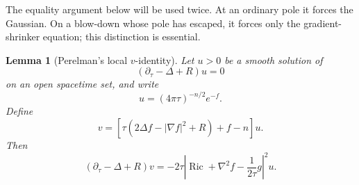 \documentclass[10pt]{coll-l}
\newtheorem{lemma}[theorem]{Lemma}
\theoremstyle{definition}
\theoremstyle{remark}
\numberwithin{section}{chapter}
\numberwithin{equation}{chapter}
\newcommand{\Ric}{\operatorname{Ric}}
\begin{document}
The equality argument below will be used twice.  At an ordinary pole it
forces the Gaussian.  On a blow-down whose pole has escaped, it forces only
the gradient-shrinker equation; this distinction is essential.

\begin{lemma}[Perelman's local $v$-identity]
\label{lem:red-v-identity}
Let $u>0$ be a smooth solution of
\begin{equation}
                    (\partial_\tau-\Delta+R)u=0         \label{eq:red-conjugate-heat-equality}
\end{equation}
on an open spacetime set, and write
\begin{equation}
                    u=(4\pi\tau)^{-n/2}e^{-f}.           \label{eq:red-density-potential}
\end{equation}
Define
\begin{equation}
 v=\left[\tau(2\Delta f-|\nabla f|^2+R)+f-n\right]u.    \label{eq:red-v-definition}
\end{equation}
Then
\begin{equation}
 (\partial_\tau-\Delta+R)v
 =-2\tau\left|\Ric+\nabla^2f-\frac1{2\tau}g\right|^2u.
                                                               \label{eq:red-v-identity}
\end{equation}
\end{lemma}
\end{document}
